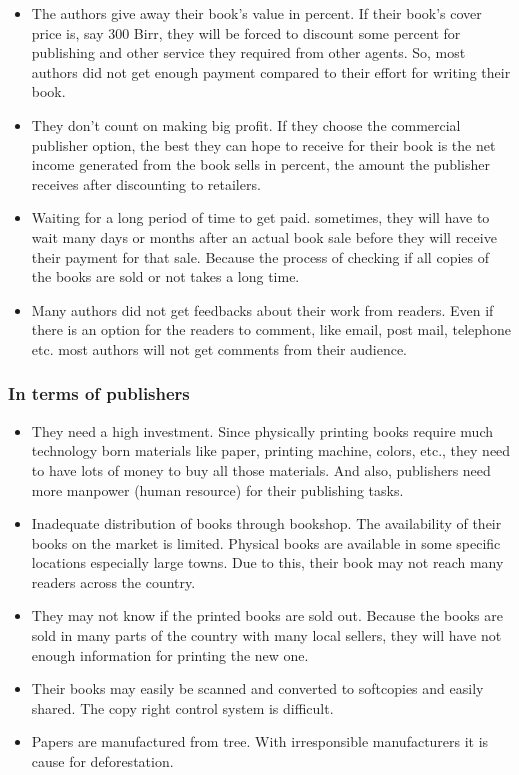 \begin{itemize}
	\item The authors give away their book’s value in percent. If their book's cover price is, say 300 Birr, they will be forced to discount some percent for publishing and other service they required from other agents. So, most authors did not get enough payment compared to their effort for writing their book.
	\item They don't count on making big profit. If they choose the commercial publisher option, the best they can hope to receive for their book is the net income generated from the book sells in percent, the amount the publisher receives after discounting to retailers.
	\item Waiting for a long period of time to get paid. sometimes, they will have to wait many days or months after an actual book sale before they will receive their payment for that sale. Because the process of checking if all copies of the books are sold or not takes a long time.
	\item Many authors did not get feedbacks about their work from readers. Even if there is an option for the readers to comment, like email, post mail, telephone etc. most authors will not get comments from their audience.
\end{itemize}

		\subsubsection{In terms of publishers}

\begin{itemize}
	\item They need a high investment. Since physically printing books require much technology born materials like paper, printing machine, colors, etc., they need to have lots of money to buy all those materials. And also, publishers need more manpower (human resource) for their publishing tasks.
	\item Inadequate distribution of books through bookshop. The availability of their books on the market is limited. Physical books are available in some specific locations especially large towns. Due to this, their book may not reach many readers across the country.
	\item They may not know if the printed books are sold out. Because the books are sold in many parts of the country with many local sellers, they will have not enough information for printing the new one.
	\item Their books may easily be scanned and converted to softcopies and easily shared. The copy right control system is difficult.
	\item Papers are manufactured from tree. With irresponsible manufacturers it is cause for deforestation.
\end{itemize}

